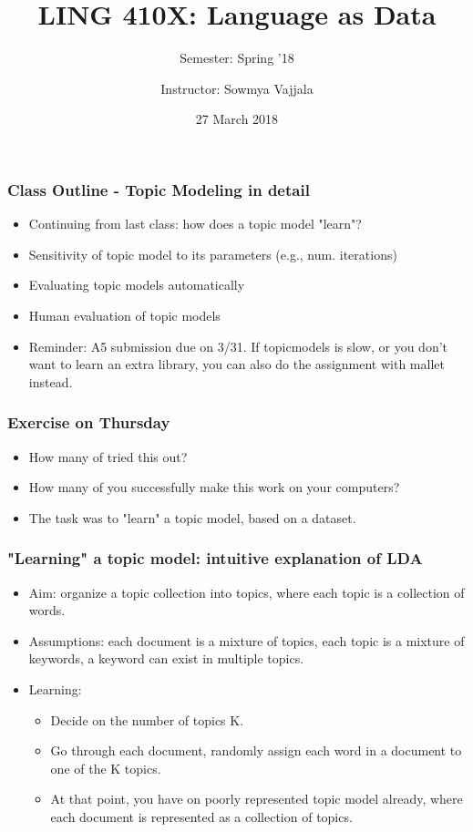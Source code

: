 \documentclass{beamer}
\author[Sowmya Vajjala]{Instructor: Sowmya Vajjala}
\title[LING 410X]{LING 410X: Language as Data}
\subtitle{Semester: Spring '18}
\date{27 March 2018}
\institute{Iowa State University, USA}
\begin{document}
\begin{frame}\titlepage
\end{frame}

\begin{frame}
\frametitle{Class Outline - Topic Modeling in detail}
\begin{itemize}
\item Continuing from last class: how does a topic model "learn"?
\item Sensitivity of topic model to its parameters (e.g., num. iterations)
\item Evaluating topic models automatically
\item Human evaluation of topic models \pause
\item Reminder: A5 submission due on 3/31. If topicmodels is slow, or you don't want to learn an extra library, you can also do the assignment with mallet instead. 
\end{itemize}
\end{frame}


\begin{frame}
\frametitle{Exercise on Thursday}
\begin{itemize}
\item How many of tried this out?
\item How many of you successfully make this work on your computers?
\item \pause The task was to "learn" a topic model, based on a dataset. 
\end{itemize}
\end{frame}

\begin{frame}
\frametitle{"Learning" a topic model: intuitive explanation of LDA}
\begin{itemize}
\item Aim: organize a topic collection into topics, where each topic is a collection of words.
\item Assumptions: each document is a mixture of topics, each topic is a mixture of keywords, a keyword can exist in multiple topics.
\pause \item Learning:
\begin{itemize}
\item Decide on the number of topics K. 
\item Go through each document, randomly assign each word in a document to one of the K topics. 
\item At that point, you have on poorly represented topic model already, where each document is represented as a collection of topics.
\end{itemize}
\end{itemize}
\end{frame}
\end{document}
